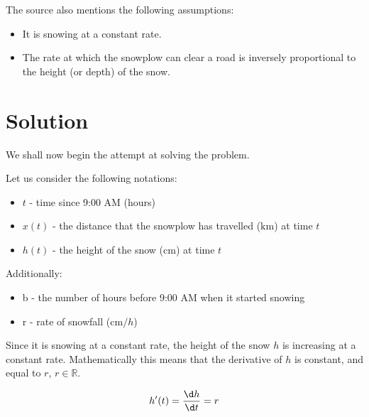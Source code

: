 \documentclass[a4paper,12pt]{article}
\begin{document}
    The source also mentions the following assumptions:
    \begin{itemize}
        \item It is snowing at a constant rate.
        \item The rate at which the snowplow can clear a road is inversely proportional to the height (or depth) of the snow.
    \end{itemize}

\section{Solution}
    We shall now begin the attempt at solving the problem. 

    \noindent Let us consider the following notations:
    \begin{itemize}
        \item $t$ - time since 9:00 AM (hours)
        \item $x(t)$ - the distance that the snowplow has travelled ($\unit{\kilo\meter}$) at time $t$
        \item $h(t)$ - the height of the snow ($\unit{\centi\meter}$) at time $t$
    \end{itemize}
    Additionally:
    \begin{itemize}
        \item b - the number of hours before 9:00 AM when it started snowing
        \item r - rate of snowfall ($\unit{\centi\meter / h}$)
    \end{itemize}

    Since it is snowing at a constant rate, the height of the snow $h$ is increasing at a constant rate. Mathematically this means that the derivative of $h$ is constant, and equal to $r$, $r \in \mathbb{R}$.

    \begin{align*}
        h'(t) = \frac{\d h}{\d t} = r
    \end{align*}
\end{document}
